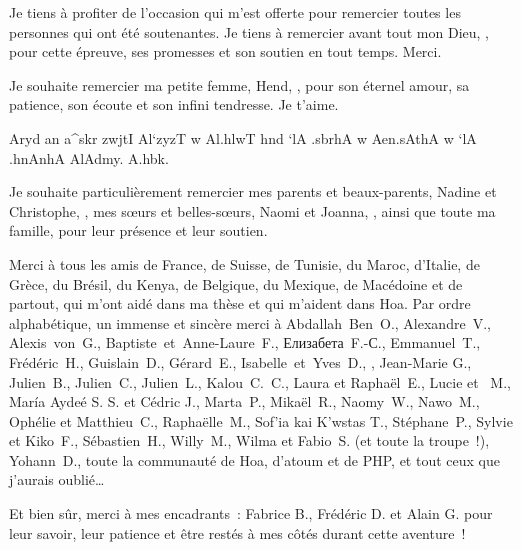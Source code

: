  Je tiens à profiter de l'occasion qui m'est
offerte pour remercier toutes les personnes qui ont été soutenantes. Je tiens à
remercier avant tout mon Dieu, , pour cette épreuve,
ses promesses et son soutien en tout temps. Merci.

Je souhaite remercier ma petite femme, Hend, , pour son
éternel amour, sa patience, son écoute et son infini tendresse. Je t'aime.
%
\begin{arabtex}
%
Aryd an a^skr zwjtI Al`zyzT w Al.hlwT hnd `lA .sbrhA w
Aen.sAthA w `lA .hnAnhA AlAdmy. A.hbk.
%
\end{arabtex}

Je souhaite particulièrement remercier mes parents et beaux-parents, Nadine et
Christophe, , mes sœurs et belles-sœurs, Naomi et Joanna,
, ainsi que toute ma famille, pour leur présence et leur
soutien.

Merci à tous les amis de France, de Suisse, de Tunisie, du Maroc, d'Italie, de
Grèce, du Brésil, du Kenya, de Belgique, du Mexique, de Macédoine et de partout,
qui m'ont aidé dans ma thèse et qui m'aident dans Hoa. Par ordre alphabétique,
un immense et sincère merci à
Abdallah~Ben~O.,
Alexandre~V.,
Alexis~von~G.,
Baptiste~et~Anne-Laure~F.,
\foreignlanguage{russian}{Елизабета}~F.-\foreignlanguage{russian}{С}.,
Emmanuel~T.,
Frédéric~H.,
Guislain~D.,
Gérard~E.,
Isabelle~et~Yves~D.,
,
Jean-Marie G.,
Julien~B.,
Julien~C.,
Julien~L.,
Kalou~C.~C.,
Laura et Raphaël~E.,
Lucie et ~M.,
\foreignlanguage{spanish}{María Aydeé} S. S. et Cédric J.,
Marta~P.,
Mikaël~R.,
\foreignlanguage{english}{Naomy~W.},
Nawo~M.,
Ophélie et Matthieu~C.,
Raphaëlle~M.,
\foreignlanguage{greek}{\textgreek{Sof'ia kai K'wstas T.}},
Stéphane~P.,
Sylvie et Kiko~F.,
Sébastien~H.,
Willy~M.,
Wilma et \foreignlanguage{italian}{Fabio}~S. (et toute la troupe~!),
Yohann~D.,
toute la communauté de Hoa, d'atoum et de PHP,
et tout ceux que j'aurais oublié…

Et bien sûr, merci à mes encadrants~: Fabrice B., Frédéric D. et Alain G. pour
leur savoir, leur patience et être restés à mes côtés durant cette aventure~!

